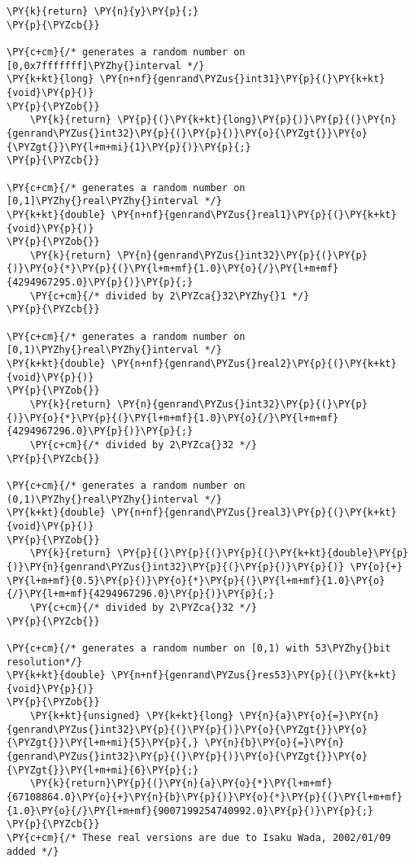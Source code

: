 \begin{Verbatim}[commandchars=\\\{\}]
    \PY{k}{return} \PY{n}{y}\PY{p}{;}
\PY{p}{\PYZcb{}}

\PY{c+cm}{/* generates a random number on [0,0x7fffffff]\PYZhy{}interval */}
\PY{k+kt}{long} \PY{n+nf}{genrand\PYZus{}int31}\PY{p}{(}\PY{k+kt}{void}\PY{p}{)}
\PY{p}{\PYZob{}}
    \PY{k}{return} \PY{p}{(}\PY{k+kt}{long}\PY{p}{)}\PY{p}{(}\PY{n}{genrand\PYZus{}int32}\PY{p}{(}\PY{p}{)}\PY{o}{\PYZgt{}}\PY{o}{\PYZgt{}}\PY{l+m+mi}{1}\PY{p}{)}\PY{p}{;}
\PY{p}{\PYZcb{}}

\PY{c+cm}{/* generates a random number on [0,1]\PYZhy{}real\PYZhy{}interval */}
\PY{k+kt}{double} \PY{n+nf}{genrand\PYZus{}real1}\PY{p}{(}\PY{k+kt}{void}\PY{p}{)}
\PY{p}{\PYZob{}}
    \PY{k}{return} \PY{n}{genrand\PYZus{}int32}\PY{p}{(}\PY{p}{)}\PY{o}{*}\PY{p}{(}\PY{l+m+mf}{1.0}\PY{o}{/}\PY{l+m+mf}{4294967295.0}\PY{p}{)}\PY{p}{;} 
    \PY{c+cm}{/* divided by 2\PYZca{}32\PYZhy{}1 */} 
\PY{p}{\PYZcb{}}

\PY{c+cm}{/* generates a random number on [0,1)\PYZhy{}real\PYZhy{}interval */}
\PY{k+kt}{double} \PY{n+nf}{genrand\PYZus{}real2}\PY{p}{(}\PY{k+kt}{void}\PY{p}{)}
\PY{p}{\PYZob{}}
    \PY{k}{return} \PY{n}{genrand\PYZus{}int32}\PY{p}{(}\PY{p}{)}\PY{o}{*}\PY{p}{(}\PY{l+m+mf}{1.0}\PY{o}{/}\PY{l+m+mf}{4294967296.0}\PY{p}{)}\PY{p}{;} 
    \PY{c+cm}{/* divided by 2\PYZca{}32 */}
\PY{p}{\PYZcb{}}

\PY{c+cm}{/* generates a random number on (0,1)\PYZhy{}real\PYZhy{}interval */}
\PY{k+kt}{double} \PY{n+nf}{genrand\PYZus{}real3}\PY{p}{(}\PY{k+kt}{void}\PY{p}{)}
\PY{p}{\PYZob{}}
    \PY{k}{return} \PY{p}{(}\PY{p}{(}\PY{p}{(}\PY{k+kt}{double}\PY{p}{)}\PY{n}{genrand\PYZus{}int32}\PY{p}{(}\PY{p}{)}\PY{p}{)} \PY{o}{+} \PY{l+m+mf}{0.5}\PY{p}{)}\PY{o}{*}\PY{p}{(}\PY{l+m+mf}{1.0}\PY{o}{/}\PY{l+m+mf}{4294967296.0}\PY{p}{)}\PY{p}{;} 
    \PY{c+cm}{/* divided by 2\PYZca{}32 */}
\PY{p}{\PYZcb{}}

\PY{c+cm}{/* generates a random number on [0,1) with 53\PYZhy{}bit resolution*/}
\PY{k+kt}{double} \PY{n+nf}{genrand\PYZus{}res53}\PY{p}{(}\PY{k+kt}{void}\PY{p}{)} 
\PY{p}{\PYZob{}} 
    \PY{k+kt}{unsigned} \PY{k+kt}{long} \PY{n}{a}\PY{o}{=}\PY{n}{genrand\PYZus{}int32}\PY{p}{(}\PY{p}{)}\PY{o}{\PYZgt{}}\PY{o}{\PYZgt{}}\PY{l+m+mi}{5}\PY{p}{,} \PY{n}{b}\PY{o}{=}\PY{n}{genrand\PYZus{}int32}\PY{p}{(}\PY{p}{)}\PY{o}{\PYZgt{}}\PY{o}{\PYZgt{}}\PY{l+m+mi}{6}\PY{p}{;} 
    \PY{k}{return}\PY{p}{(}\PY{n}{a}\PY{o}{*}\PY{l+m+mf}{67108864.0}\PY{o}{+}\PY{n}{b}\PY{p}{)}\PY{o}{*}\PY{p}{(}\PY{l+m+mf}{1.0}\PY{o}{/}\PY{l+m+mf}{9007199254740992.0}\PY{p}{)}\PY{p}{;} 
\PY{p}{\PYZcb{}} 
\PY{c+cm}{/* These real versions are due to Isaku Wada, 2002/01/09 added */}
\end{Verbatim}
